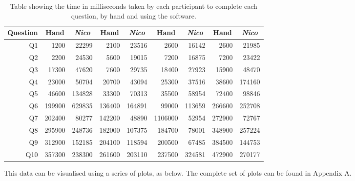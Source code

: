\documentclass[12pt,twoside,notitlepage,xetex]{report}
\begin{document}
\begin{center}
\begin{table}[H]
\begin{center}
\begin{tabular}{|r||r|r||r|r||r|r||r|r|}
\multicolumn{1}{|c||}{Question} & \multicolumn{1}{c|}{Hand} & \multicolumn{1}{c||}{\emph{Nico}} & \multicolumn{1}{c|}{Hand} & \multicolumn{1}{c||}{\emph{Nico}} & \multicolumn{1}{c|}{Hand} & \multicolumn{1}{c||}{\emph{Nico}} & \multicolumn{1}{c|}{Hand} & \multicolumn{1}{c|}{\emph{Nico}}\\ \hline \hline
Q1 & 1200 & 22299 & 2100 & 23516 & 2600 & 16142 & 2600 & 21985\\ \hline
Q2 & 2200 & 24530 & 5600 & 19015 & 7200 & 16875 & 7200 & 23422\\ \hline
Q3 & 17300 & 47620 & 7600 & 29735 & 18400 & 27923 & 15900 & 48470\\ \hline
Q4 & 23000 & 50704 & 20700 & 43094 & 25300 & 37516 & 38600 & 174160\\ \hline
Q5 & 46600 & 134828 & 33300 & 70313 & 35500 & 58954 & 72400 & 98846\\ \hline
Q6 & 199900 & 629835 & 136400 & 164891 & 99000 & 113659 & 266600 & 252708\\ \hline
Q7 & 202400 & 80277 & 142200 & 48890 & 1106000 & 52954 & 272900 & 72767\\ \hline
Q8 & 295900 & 248736 & 182000 & 107375 & 184700 & 78001 & 348900 & 257224\\ \hline
Q9 & 312900 & 152185 & 204100 & 118594 & 200500 & 67485 & 384500 & 144753\\ \hline
Q10 & 357300 & 238300 & 261600 & 203110 & 237500 & 324581 & 472900 & 270177\\
\hline
\end{tabular}
\end{center}
\caption{Table showing the time in milliseconds taken by each participant to complete each question, by hand and using the software.}
\label{tab:BigTimes}
\end{table}
\end{center}

This data can be visualised using a series of plots, as below.  The complete set of plots can be found in Appendix A.
\end{document}
